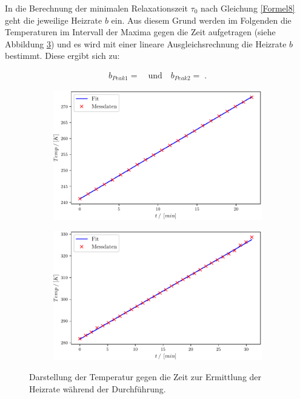 In die Berechnung der minimalen Relaxationszeit $\tau_0$ nach Gleichung \eqref{Formel8} geht die jeweilige Heizrate $b$ ein. Aus diesem Grund werden im Folgenden die Temperaturen im Intervall der Maxima gegen die Zeit aufgetragen (siehe Abbildung \ref{fig:Auswertung_20_21}) und es wird mit einer lineare Ausgleichsrechnung die Heizrate $b$ bestimmt. Diese ergibt sich zu:

\begin{align}
	b_{Peak1} =   \quad \text{und} \quad b_{Peak2} = \;.
\end{align}

\begin{figure}
\centering
\begin{subfigure}{.5\textwidth}
	\centering
	\includegraphics[width=1\textwidth]{build/2_Temp_Time_Peak1.pdf}
	\caption{}
	\label{fig:Auswertung_20}
\end{subfigure}%
\begin{subfigure}{.5\textwidth}
	\centering
	\includegraphics[width=1\textwidth]{build/2_Temp_Time_Peak2.pdf}
	\caption{}
	\label{fig:Auswertung_21}
\end{subfigure}
\caption{Darstellung der Temperatur gegen die Zeit zur Ermittlung der Heizrate während der Durchführung.}
\label{fig:Auswertung_20_21}
\end{figure}

